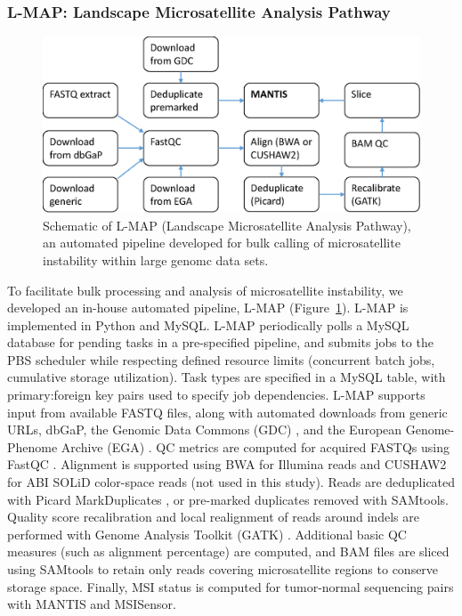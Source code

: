 \subsubsection{L-MAP: Landscape Microsatellite Analysis Pathway}
\begin{figure}[htp]
	\centering
	\includegraphics[width=0.8\linewidth,keepaspectratio]{images/msilandscape/lmap_flowchart}
	\caption[Schematic of L-MAP for bulk MSI analysis.]{Schematic of L-MAP (Landscape Microsatellite Analysis Pathway), an automated pipeline developed for bulk calling of microsatellite instability within large genomc data sets.}
	\label{fig:msilandscape:lmap_flowchart}
\end{figure}
To facilitate bulk processing and analysis of microsatellite instability, we developed an in-house automated pipeline, L-MAP (Figure~\ref{fig:msilandscape:lmap_flowchart}). L-MAP is implemented in Python and MySQL\@. L-MAP periodically polls a MySQL database for pending tasks in a pre-specified pipeline, and submits jobs to the PBS scheduler while respecting defined resource limits (concurrent batch jobs, cumulative storage utilization). Task types are specified in a MySQL table, with primary:foreign key pairs used to specify job dependencies. L-MAP supports input from available FASTQ files, along with automated downloads from generic URLs, dbGaP, the Genomic Data Commons (GDC) \cite{grossman2016}, and the European Genome-Phenome Archive (EGA) \cite{lappalainen2015}. QC metrics are computed for acquired FASTQs using FastQC \cite{fastqc}. Alignment is supported using BWA \cite{bwa} for Illumina reads and CUSHAW2 \cite{liu2012} for ABI SOLiD color-space reads (not used in this study). Reads are deduplicated with Picard MarkDuplicates \cite{Picard2019toolkit}, or pre-marked duplicates removed with SAMtools. Quality score recalibration and local realignment of reads around indels are performed with Genome Analysis Toolkit (GATK) \cite{mckenna10}. Additional basic QC measures (such as alignment percentage) are computed, and BAM files are sliced using SAMtools to retain only reads covering microsatellite regions to conserve storage space. Finally, MSI status is computed for tumor-normal sequencing pairs with MANTIS and MSISensor.

